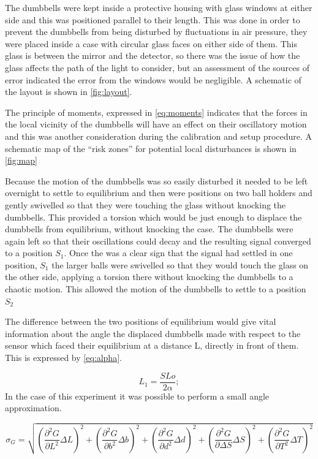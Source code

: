 \documentclass[12pt]{article}
\begin{document}
 The dumbbells were kept inside a protective housing with glass windows at either side and this was positioned parallel to their length. This was done in order to prevent the dumbbells from being disturbed by fluctuations in air pressure, they were placed inside a case with circular glass faces on either side of them. This glass is between the mirror and the detector, so there was the issue of how the glass affects the path of the light to consider, but an assessment of the sources of error indicated the error from the windows would be negligible. A schematic of the layout is shown in \cref{fig:layout}.\noindent  

 
The principle of moments, expressed in \cref{eq:moments} indicates that the forces in the local vicinity of the dumbbells will have an effect on their oscillatory motion and this was another consideration during the calibration and setup procedure. A schematic map of the \enquote{risk zones} for potential local disturbances is shown in \cref{fig:map}

Because the motion of the dumbbells was so easily disturbed it needed to be left overnight to settle to equilibrium and then were positions on two ball holders and gently swivelled so that they were touching the glass without knocking the dumbbells. This provided a torsion which would be just enough to displace the dumbbells from equilibrium, without knocking the case. The dumbbells were again left so that their oscillations could decay and the resulting signal converged to a position $S_{1}$. Once the was a clear sign that the signal had settled in one position, $S_{1}$ the larger balls were swivelled so that they would touch the glass on the other side, applying a torsion there without knocking the dumbbells to a chaotic motion. This allowed the motion of the dumbbells to settle to a position $S_{2}$

The difference between the two positions of equilibrium would give vital information about the angle the displaced dumbbells made with respect to the sensor which faced their equilibrium at a distance L, directly in front of them. This is expressed by \cref{eq:alpha}.

\begin{equation}
\label{eq:alpha}
L_{1}=\frac{ S Lo}{2\alpha};
\end{equation}
In the case of this experiment it was possible to perform a small angle approximation.

\begin{equation}
\label{eq:errorG}
\sigma_{G}=\sqrt{\left(\frac{\partial^{2}{G}}{\partial{}{L}^{2}}\Delta{L}\right)^{2}
+\left(\frac{\partial^{2}{G}}{\partial{}{b}^{2}}\Delta{b}\right)^{2}
+\left(\frac{\partial^{2}{G}}{\partial{}{d}^{2}}\Delta{d}\right)^{2}
+\left(\frac{\partial^{2}{G}}{\partial{\Delta{S}}} \Delta{S}\right)^{2}
+\left(\frac{\partial^{2}{G}}{\partial{T}^{2}}{\Delta{T}}\right)^{2}}

\end{equation}
\end{document}
